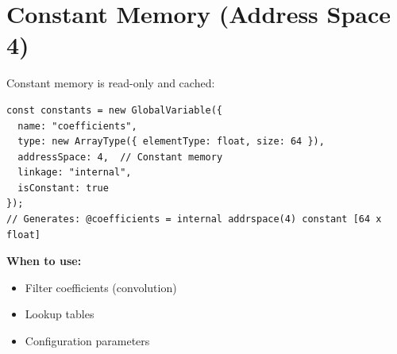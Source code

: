 \section{Constant Memory (Address Space 4)}

Constant memory is read-only and cached:

\begin{lstlisting}[style=ts]
const constants = new GlobalVariable({
  name: "coefficients",
  type: new ArrayType({ elementType: float, size: 64 }),
  addressSpace: 4,  // Constant memory
  linkage: "internal",
  isConstant: true
});
// Generates: @coefficients = internal addrspace(4) constant [64 x float]
\end{lstlisting}

\textbf{When to use:}
\begin{itemize}[noitemsep]
  \item Filter coefficients (convolution)
  \item Lookup tables
  \item Configuration parameters
\end{itemize}

